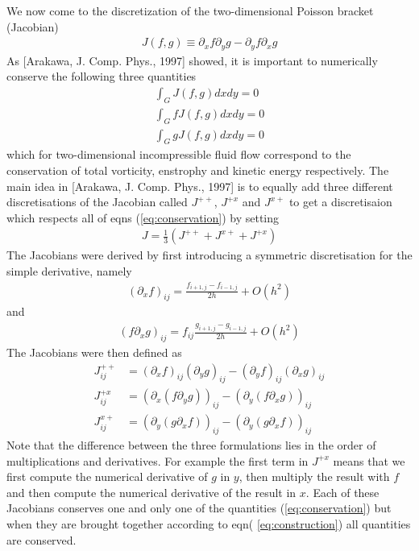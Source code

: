 \documentclass[a4paper,12pt]{scrartcl}
\begin{document}
We now come to the discretization of the two-dimensional Poisson bracket (Jacobian)
\begin{align}
    J(f,g) \equiv \partial_x f \partial_y g - \partial_y f\partial_x g
    \label{eq:jacobian}
\end{align}
As [Arakawa, J. Comp. Phys., 1997] showed, it is important to numerically conserve
the following three quantities
\begin{subequations}
\begin{align}
    \int_G J(f,g) dxdy = 0 \\
    \int_G fJ(f,g) dxdy = 0\\
    \int_G gJ(f,g) dxdy = 0
    \label{eq:conservation}
\end{align}
\end{subequations}
which for two-dimensional incompressible fluid flow correspond to the conservation of
total vorticity, enstrophy and kinetic energy respectively.
The main idea in [Arakawa, J. Comp. Phys., 1997] is
to equally add three different discretisations of the Jacobian called $J^{++}$, 
$J^{+x}$ and $J^{x+}$ to get a discretisaion which respects all of 
eqns (\ref{eq:conservation}) by setting
\begin{align}
    J = \frac{1}{3}\left( J^{++}+J^{x+}+J^{+x} \right)   
    \label{eq:construction}
\end{align}
The Jacobians were derived by first introducing a symmetric discretisation for the
simple derivative, namely
\begin{align}
    (\partial_x f)_{ij} = \frac{f_{i+1,j}-f_{i-1,j}}{2h} + O(h^2)
    \label{eq:derivative}
\end{align}
and 
\begin{align}
    (f\partial_x g)_{ij} = f_{ij}\frac{g_{i+1,j}-g_{i-1,j}}{2h}+O(h^2)
    \label{}
\end{align}
The Jacobians were then defined as
\begin{subequations}
\begin{align}
    J_{ij}^{++} &= (\partial_x f)_{ij} (\partial_y g)_{ij} - (\partial_y f)_{ij}(\partial_x g)_{ij} \\
    J_{ij}^{+x} &= (\partial_x( f\partial_y g))_{ij} - (\partial_y( f\partial_x g))_{ij}\\
    J_{ij}^{x+} &= (\partial_y( g\partial_x f))_{ij} - (\partial_y( g\partial_x f))_{ij}
    \label{}
\end{align}
\label{}
\end{subequations}
Note that the difference between the three formulations lies in the 
order of multiplications and derivatives. 
For example the first term in $J^{+x}$ means that we
first compute the numerical derivative of $g$ in $y$, 
then multiply the result with 
$f$ and then compute the numerical derivative of the result in $x$.
Each of these Jacobians conserves one and only one of the quantities (\ref{eq:conservation}) but when they are brought together according to eqn( \ref{eq:construction})
all quantities are conserved. 
\end{document}
